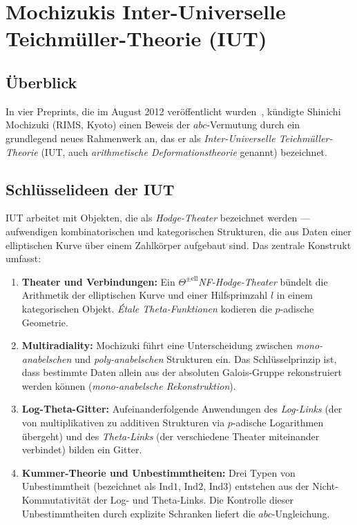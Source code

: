 \documentclass[12pt,a4paper]{article}
\theoremstyle{remark}
\begin{document}
\section{Mochizukis Inter-Universelle Teichmüller-Theorie (IUT)}

\subsection{Überblick}

In vier Preprints, die im August 2012 veröffentlicht wurden~\cite{Mochizuki2012a,Mochizuki2012b,
Mochizuki2012c,Mochizuki2012d}, kündigte Shinichi Mochizuki (RIMS, Kyoto) einen Beweis der
$abc$-Vermutung durch ein grundlegend neues Rahmenwerk an, das er als
\emph{Inter-Universelle Teichmüller-Theorie} (IUT, auch \emph{arithmetische Deformationstheorie}
genannt) bezeichnet.

\subsection{Schlüsselideen der IUT}

IUT arbeitet mit Objekten, die als \emph{Hodge-Theater} bezeichnet werden — aufwendigen
kombinatorischen und kategorischen Strukturen, die aus Daten einer elliptischen Kurve über
einem Zahlkörper aufgebaut sind. Das zentrale Konstrukt umfasst:

\begin{enumerate}[nosep]
  \item \textbf{Theater und Verbindungen:} Ein \emph{$\Theta^{\pm\text{ell}}$NF-Hodge-Theater}
    bündelt die Arithmetik der elliptischen Kurve und einer Hilfsprimzahl $l$ in einem
    kategorischen Objekt. \emph{Étale Theta-Funktionen} kodieren die $p$-adische Geometrie.
  \item \textbf{Multiradiality:} Mochizuki führt eine Unterscheidung zwischen
    \emph{mono-anabelschen} und \emph{poly-anabelschen} Strukturen ein. Das Schlüsselprinzip
    ist, dass bestimmte Daten allein aus der absoluten Galois-Gruppe rekonstruiert werden
    können (\emph{mono-anabelsche Rekonstruktion}).
  \item \textbf{Log-Theta-Gitter:} Aufeinanderfolgende Anwendungen des \emph{Log-Links}
    (der von multiplikativen zu additiven Strukturen via $p$-adische Logarithmen übergeht)
    und des \emph{Theta-Links} (der verschiedene Theater miteinander verbindet) bilden
    ein Gitter.
  \item \textbf{Kummer-Theorie und Unbestimmtheiten:} Drei Typen von Unbestimmtheit
    (bezeichnet als $\mathrm{Ind}1$, $\mathrm{Ind}2$, $\mathrm{Ind}3$) entstehen aus der
    Nicht-Kommutativität der Log- und Theta-Links. Die Kontrolle dieser Unbestimmtheiten
    durch explizite Schranken liefert die $abc$-Ungleichung.
\end{enumerate}
\end{document}
